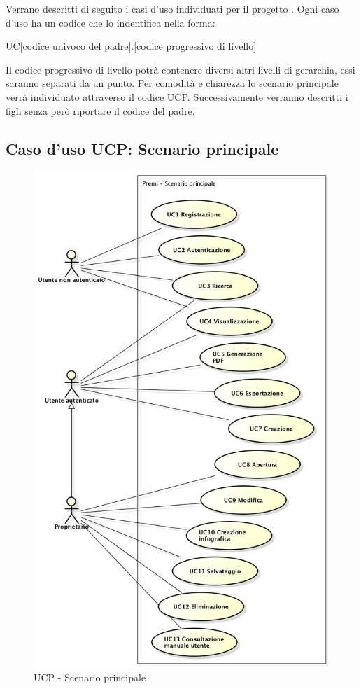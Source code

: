 Verrano descritti di seguito i casi d'uso individuati per il progetto \PROGETTO. Ogni caso d'uso ha un codice che lo indentifica nella forma:
\begin{center}
	UC[codice univoco del padre].[codice progressivo di livello]
\end{center}
Il codice progressivo di livello potrà contenere diversi altri livelli di gerarchia, essi saranno separati da un punto. Per comodità e chiarezza lo scenario principale verrà individuato attraverso il codice UCP. Successivamente verranno descritti i figli senza però riportare il codice del padre.

\subsection{Caso d'uso UCP: Scenario principale}
\begin{figure}[h] 
	\centering 
	\includegraphics[scale=0.5] {img/UCP.png} 
	\caption{UCP - Scenario principale} 
\end{figure}

